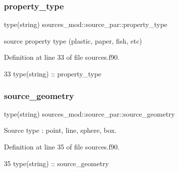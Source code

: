 \subsubsection{\texorpdfstring{property\+\_\+type}{property\_type}}
{\footnotesize\ttfamily type(string) sources\+\_\+mod\+::source\+\_\+par\+::property\+\_\+type\hspace{0.3cm}{\ttfamily [private]}}



source property type (plastic, paper, fish, etc) 



Definition at line 33 of file sources.\+f90.


\begin{DoxyCode}
33         \textcolor{keywordtype}{type}(string) :: property\_type
\end{DoxyCode}
\mbox{\label{structsources__mod_1_1source__par_a66e7627f128290f25c2c9eb36808eb5b}} 
\subsubsection{\texorpdfstring{source\+\_\+geometry}{source\_geometry}}
{\footnotesize\ttfamily type(string) sources\+\_\+mod\+::source\+\_\+par\+::source\+\_\+geometry\hspace{0.3cm}{\ttfamily [private]}}



Source type \+: \textquotesingle{}point\textquotesingle{}, \textquotesingle{}line\textquotesingle{}, \textquotesingle{}sphere\textquotesingle{}, \textquotesingle{}box\textquotesingle{}. 



Definition at line 35 of file sources.\+f90.


\begin{DoxyCode}
35         \textcolor{keywordtype}{type}(string) :: source\_geometry
\end{DoxyCode}
\mbox{\label{structsources__mod_1_1source__par_afcde2655b2a557f3a3e2c952dc8a51b0}} 
